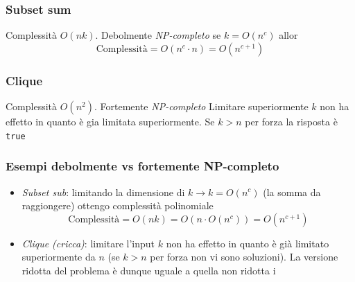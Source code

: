 \subsubsection{Subset sum}
Complessità $ O\left(nk\right) $. Debolmente \textit{NP-completo}
\vskip3mm
se $ k = O\left(n^{c}\right) $  allor
\[
	\text{Complessità} = O\left(n^{c} \cdot n\right) = O\left(n^{c+1}\right)
\]

\subsubsection{Clique}
Complessità $ O\left(n^{2}\right) $. Fortemente \textit{NP-completo}
\vskip3mm
Limitare superiormente $ k $ non ha effetto in quanto è gia limitata superiormente. Se $ k > n $ per forza la risposta è \verb|true|

\subsubsection{Esempi debolmente vs fortemente NP-completo}
\begin{itemize}
	\item \textit{Subset sub}: limitando la dimensione di $ k  \rightarrow k = O\left(n^{c}\right)$ (la somma da raggiongere) ottengo complessità polinomiale
	      \[
		      \text{Complessità} = O\left(nk\right) = O \left(n \cdot  O\left(n^{c}\right)\right) = O \left(n^{c+1}\right)
	      \]
	\item \textit{Clique (cricca)}: limitare l'input $ k $ non ha effetto in quanto è già limitato superiormente da $ n $ (se $ k>n $ per forza non vi sono soluzioni). La versione ridotta del problema è dunque uguale a quella non ridotta
	      i
\end{itemize}

